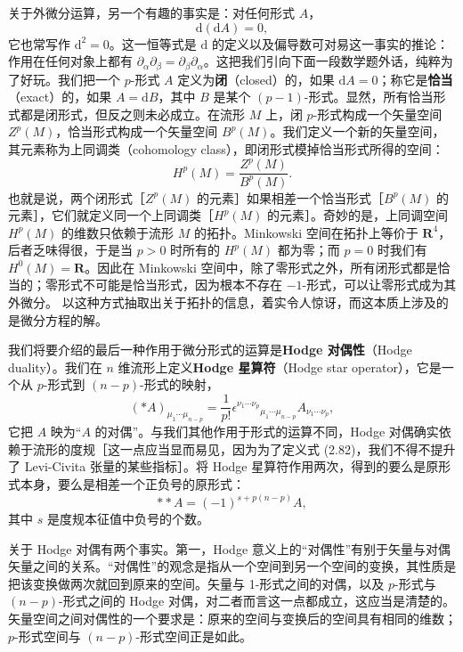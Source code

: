 关于外微分运算，另一个有趣的事实是：对任何形式 $A$，
\begin{equation*}
\mathrm{d}(\mathrm{d}A)=0, \tag{2.80}
\end{equation*}
它也常写作 $\mathrm{d}^{2}=0$。这一恒等式是 $\mathrm{d}$ 的定义以及偏导数可对易这一事实的推论：作用在任何对象上都有 $\partial_{\alpha}\partial_{\beta}=\partial_{\beta}\partial_{\alpha}$。这把我们引向下面一段数学题外话，纯粹为了好玩。我们把一个 $p$-形式 $A$ 定义为\textbf{闭}（closed）的，如果 $\mathrm{d}A=0$；称它是\textbf{恰当}（exact）的，如果 $A=\mathrm{d}B$，其中 $B$ 是某个 $(p-1)$-形式。显然，所有恰当形式都是闭形式，但反之则未必成立。在流形 $M$ 上，闭 $p$-形式构成一个矢量空间 $Z^{p}(M)$，恰当形式构成一个矢量空间 $B^{p}(M)$。我们定义一个新的矢量空间，其元素称为上同调类（cohomology class），即闭形式模掉恰当形式所得的空间：
\begin{equation*}
H^{p}(M)=\frac{Z^{p}(M)}{B^{p}(M)}. \tag{2.81}
\end{equation*}
也就是说，两个闭形式［$Z^{p}(M)$ 的元素］如果相差一个恰当形式［$B^{p}(M)$ 的元素］，它们就定义同一个上同调类［$H^{p}(M)$ 的元素］。奇妙的是，上同调空间 $H^{p}(M)$ 的维数只依赖于流形 $M$ 的拓扑。Minkowski 空间在拓扑上等价于 $\mathbf{R}^{4}$，后者乏味得很，于是当 $p>0$ 时所有的 $H^{p}(M)$ 都为零；而 $p=0$ 时我们有 $H^{0}(M)=\mathbf{R}$。因此在 Minkowski 空间中，除了零形式之外，所有闭形式都是恰当的；零形式不可能是恰当形式，因为根本不存在 $-1$-形式，可以让零形式成为其外微分。
以这种方式抽取出关于拓扑的信息，着实令人惊讶，而这本质上涉及的是微分方程的解。

我们将要介绍的最后一种作用于微分形式的运算是\textbf{Hodge 对偶性}（Hodge duality）。我们在 $n$ 维流形上定义\textbf{Hodge 星算符}（Hodge star operator），它是一个从 $p$-形式到 $(n-p)$-形式的映射，
\begin{equation*}
(*A)_{\mu_{1}\cdots\mu_{n-p}}=\frac{1}{p!}\epsilon^{\nu_{1}\cdots\nu_{p}}{}_{\mu_{1}\cdots\mu_{n-p}}A_{\nu_{1}\cdots\nu_{p}}, \tag{2.82}
\end{equation*}
它把 $A$ 映为“$A$ 的对偶”。与我们其他作用于形式的运算不同，Hodge 对偶确实依赖于流形的度规［这一点应当显而易见，因为为了定义式 (2.82)，我们不得不提升了 Levi-Civita 张量的某些指标］。将 Hodge 星算符作用两次，得到的要么是原形式本身，要么是相差一个正负号的原形式：
\begin{equation*}
**A=(-1)^{s+p(n-p)}A, \tag{2.83}
\end{equation*}
其中 $s$ 是度规本征值中负号的个数。

关于 Hodge 对偶有两个事实。第一，Hodge 意义上的“对偶性”有别于矢量与对偶矢量之间的关系。“对偶性”的观念是指从一个空间到另一个空间的变换，其性质是把该变换做两次就回到原来的空间。矢量与 1-形式之间的对偶，以及 $p$-形式与 $(n-p)$-形式之间的 Hodge 对偶，对二者而言这一点都成立，这应当是清楚的。矢量空间之间对偶性的一个要求是：原来的空间与变换后的空间具有相同的维数；$p$-形式空间与 $(n-p)$-形式空间正是如此。

